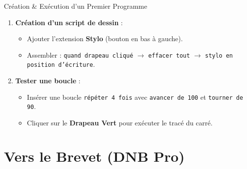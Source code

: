 \begin{tpinfo}{Création \& Exécution d'un Premier Programme}
\begin{enumerate}[leftmargin=1.5em, itemsep=2pt]
    \item \textbf{Création d'un script de dessin} :
    \begin{itemize}
        \item Ajouter l'extension \textbf{Stylo} (bouton en bas à gauche).
        \item Assembler : \texttt{quand drapeau cliqué} $\rightarrow$ \texttt{effacer tout} $\rightarrow$ \texttt{stylo en position d'écriture}.
    \end{itemize}
    \item \textbf{Tester une boucle} :
    \begin{itemize}
        \item Insérer une boucle \texttt{répéter 4 fois} avec \texttt{avancer de 100} et \texttt{tourner de 90}.
        \item Cliquer sur le \textbf{Drapeau Vert} pour exécuter le tracé du carré.
    \end{itemize}
\end{enumerate}
\end{tpinfo}

\newpage

\section{Vers le Brevet (DNB Pro)}

